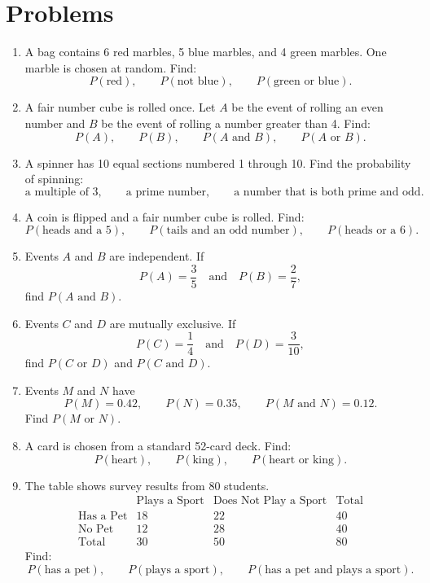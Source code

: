 \documentclass[12pt]{article}
\begin{document}
\section*{Problems}
\begin{enumerate}[leftmargin=*, itemsep=1em, topsep=0.8em]
  \item A bag contains 6 red marbles, 5 blue marbles, and 4 green marbles. One marble is chosen at random. Find:
  \[
  P(\text{red}),\qquad P(\text{not blue}),\qquad P(\text{green or blue}).
  \]

  \item A fair number cube is rolled once. Let $A$ be the event of rolling an even number and $B$ be the event of rolling a number greater than 4. Find:
  \[
  P(A),\qquad P(B),\qquad P(A\text{ and }B),\qquad P(A\text{ or }B).
  \]

  \item A spinner has 10 equal sections numbered 1 through 10. Find the probability of spinning:
  \[
  \text{a multiple of 3},\qquad
  \text{a prime number},\qquad
  \text{a number that is both prime and odd}.
  \]

  \item A coin is flipped and a fair number cube is rolled. Find:
  \[
  P(\text{heads and a 5}),\qquad
  P(\text{tails and an odd number}),\qquad
  P(\text{heads or a 6}).
  \]

  \item Events $A$ and $B$ are independent. If
  \[
  P(A)=\frac{3}{5}\quad\text{and}\quad P(B)=\frac{2}{7},
  \]
  find $P(A\text{ and }B)$.

  \item Events $C$ and $D$ are mutually exclusive. If
  \[
  P(C)=\frac{1}{4}\quad\text{and}\quad P(D)=\frac{3}{10},
  \]
  find $P(C\text{ or }D)$ and $P(C\text{ and }D)$.

  \item Events $M$ and $N$ have
  \[
  P(M)=0.42,\qquad P(N)=0.35,\qquad P(M\text{ and }N)=0.12.
  \]
  Find $P(M\text{ or }N)$.

  \item A card is chosen from a standard 52-card deck. Find:
  \[
  P(\text{heart}),\qquad P(\text{king}),\qquad P(\text{heart or king}).
  \]

  \item The table shows survey results from 80 students.
  \[
  \begin{array}{c|ccc}
   & \text{Plays a Sport} & \text{Does Not Play a Sport} & \text{Total} \\ \hline
  \text{Has a Pet} & 18 & 22 & 40 \\
  \text{No Pet} & 12 & 28 & 40 \\ \hline
  \text{Total} & 30 & 50 & 80
  \end{array}
  \]
  Find:
  \[
  P(\text{has a pet}),\qquad
  P(\text{plays a sport}),\qquad
  P(\text{has a pet and plays a sport}).
  \]


\end{enumerate}
\end{document}
